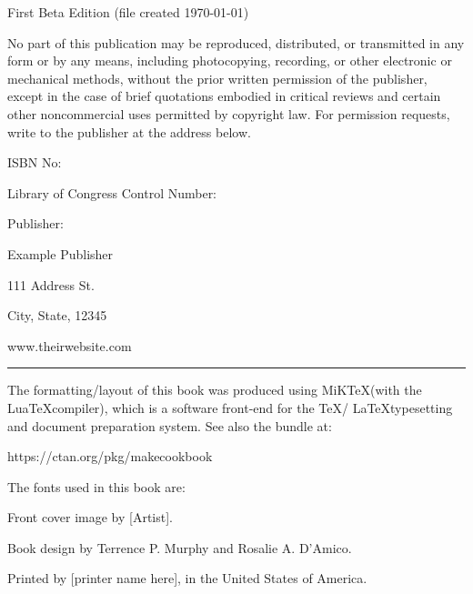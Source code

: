 
\pagestyle{empty}
\MyTitlePage{} %

\begin{CopyrightPage}
    {
    First Beta Edition (file created \today ) \par
    \CopyrightInfo{}\par

    No part of this publication may be reproduced, distributed, or transmitted in any form or by any means,
    including photocopying, recording, or other electronic or mechanical methods, without the prior written
    permission of the publisher, except in the case of brief quotations embodied in critical reviews and
    certain other noncommercial uses permitted by copyright law. For permission requests, write to the
    publisher at the address below. \par
    \vspace{5pt}
    ISBN No: {}\par
    Library of Congress Control Number: {} \par
    \vspace{5pt}
    Publisher: \par
    Example Publisher\par
    111 Address St.\par
    City, State, 12345\par
    www.theirwebsite.com

    \vspace{5pt}
    \hrule
    \vspace{5pt}
    The formatting/layout of this book was produced using MiK\TeX\space (with the Lua\TeX\space compiler),
    which is a software front-end for the \TeX\space / \LaTeX\space typesetting and document preparation
    system.  See also the  bundle at:

    \quad https://ctan.org/pkg/makecookbook

    \vspace{5pt}
    The fonts used in this book are:\par
    \vspace{6pt}
    \ColophonFonts{}
    \vspace{5pt}
    Front cover image by [Artist].\par
    Book design by Terrence P. Murphy and Rosalie A. D'Amico.\par
    Printed by [printer name here], in the United States of America. \par
    }
\end{CopyrightPage}  %


